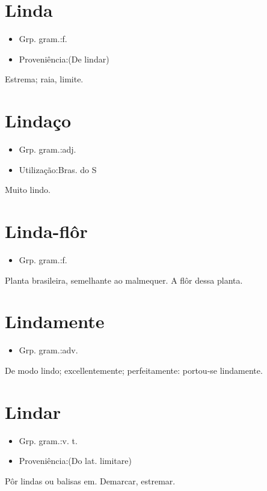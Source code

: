 \section{Linda}
\begin{itemize}
\item {Grp. gram.:f.}
\end{itemize}
\begin{itemize}
\item {Proveniência:(De \textunderscore lindar\textunderscore )}
\end{itemize}
Estrema; raia, limite.
\section{Lindaço}
\begin{itemize}
\item {Grp. gram.:adj.}
\end{itemize}
\begin{itemize}
\item {Utilização:Bras. do S}
\end{itemize}
Muito lindo.
\section{Linda-flôr}
\begin{itemize}
\item {Grp. gram.:f.}
\end{itemize}
Planta brasileira, semelhante ao malmequer.
A flôr dessa planta.
\section{Lindamente}
\begin{itemize}
\item {Grp. gram.:adv.}
\end{itemize}
De modo lindo; excellentemente; perfeitamente: \textunderscore portou-se lindamente\textunderscore .
\section{Lindar}
\begin{itemize}
\item {Grp. gram.:v. t.}
\end{itemize}
\begin{itemize}
\item {Proveniência:(Do lat. \textunderscore limitare\textunderscore )}
\end{itemize}
Pôr lindas ou balisas em.
Demarcar, estremar.
